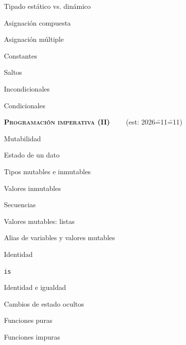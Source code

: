 \begin{longenum}
\begin{longenum}
\begin{longenum}
            \item Tipado estático vs. dinámico
            \item Asignación compuesta
            \item Asignación múltiple
            \item Constantes
        \end{longenum}
        \item Saltos
        \begin{longenum}
            \item Incondicionales
            \item Condicionales
        \end{longenum}
    \end{longenum}
    \item \textbf{\textsc{Programación imperativa (II)}} \ \ \ \ (est: 2026\==11\==11)
    \begin{longenum}
        \item Mutabilidad
        \begin{longenum}
            \item Estado de un dato
            \item Tipos mutables e inmutables
            \begin{longenum}
                \item Valores inmutables
                \begin{longenum}
                    \item Secuencias
                \end{longenum}
                \item Valores mutables: listas
            \end{longenum}
            \item Alias de variables y valores mutables
            \item Identidad
            \begin{longenum}
                \item \texttt{is}
                \item Identidad e igualdad
            \end{longenum}
        \end{longenum}
        \item Cambios de estado ocultos
        \begin{longenum}
            \item Funciones puras
            \item Funciones impuras

\end{longenum}
\end{longenum}
\end{longenum}
